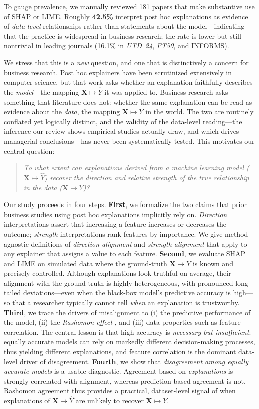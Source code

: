 \documentclass[12pt,letterpaper]{article}
\newcommand{\Xto}{\mathbf{X}\mapsto Y}
\newcommand{\Xtohat}{\mathbf{X}\mapsto \hat{Y}}
\begin{document}
To gauge prevalence, we manually reviewed 181 papers that make substantive
use of SHAP or LIME. Roughly \textbf{42.5\%} interpret post hoc explanations as
evidence of \emph{data-level} relationships rather than statements about the
model---indicating that the practice is widespread in business research; the rate
is lower but still nontrivial in leading journals (16.1\% in \textit{UTD~24},
\textit{FT50}, and INFORMS).

We stress that this is a \emph{new} question, and one that is distinctively a
concern for business research. Post hoc explainers have been scrutinized
extensively in computer science, but that work asks whether an explanation
faithfully describes the \emph{model}---the mapping $\Xtohat$ it was applied to.
Business research asks something that literature does not: whether the same
explanation can be read as evidence about the \emph{data}, the mapping $\Xto$ in
the world. The two are routinely conflated yet logically distinct, and the validity
of the data-level reading---the inference our review shows empirical studies
actually draw, and which drives managerial conclusions---has never been
systematically tested. This motivates our central question:
\begin{quote}
\emph{To what extent can explanations derived from a machine learning model
($\Xtohat$) recover the direction and relative strength of the true relationship
in the data ($\Xto$)?}
\end{quote}

Our study proceeds in four steps. \textbf{First}, we formalize the two claims that
prior business studies using post hoc explanations implicitly rely on. \emph{Direction} interpretations assert that
increasing a feature increases or decreases the outcome; \emph{strength}
interpretations rank features by importance. We give method-agnostic definitions of
\emph{direction alignment} and \emph{strength alignment} that apply to any explainer
that assigns a value to each feature. \textbf{Second}, we evaluate SHAP and LIME on simulated data where the
ground-truth $\Xto$ is known and precisely controlled. Although explanations look
truthful on average, their alignment with the ground truth is highly heterogeneous, with pronounced
long-tailed deviations---even when the black-box model's predictive accuracy is high---so that a
researcher typically cannot tell \emph{when} an explanation is trustworthy.
\textbf{Third}, we trace the drivers of misalignment to (i) the predictive
performance of the model, (ii) the \emph{Rashomon effect}
\citep{semenova22rashomon,paes23inevitable}, and (iii) data properties such as
feature correlation. The central lesson is that high accuracy is \emph{necessary
but insufficient}: equally accurate models can rely on markedly different
decision-making processes, thus yielding different
explanations, and feature correlation is the dominant data-level driver of
disagreement. \textbf{Fourth}, we show that \emph{disagreement among equally
accurate models} is a usable diagnostic. Agreement based on \emph{explanations}
 is strongly correlated with alignment, whereas prediction-based agreement is not. Rashomon
agreement thus provides a practical, dataset-level signal of when explanations of
$\Xtohat$ are unlikely to recover $\Xto$.
\end{document}
